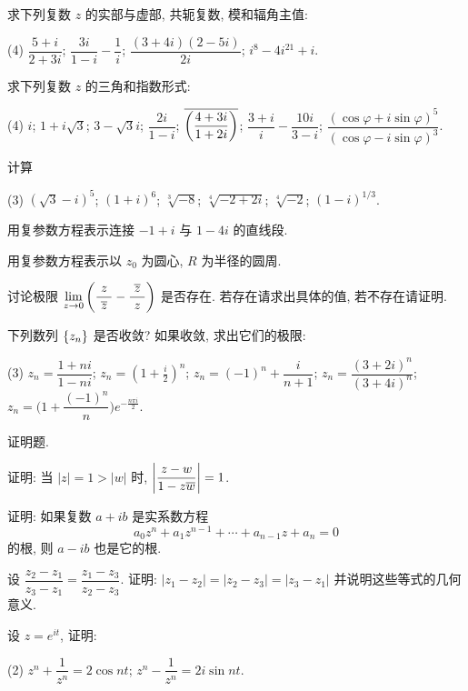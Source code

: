 \begin{homework}
\begin{exlist}
      \item 求下列复数 $z$ 的实部与虚部, 共轭复数, 模和辐角主值:
        \begin{tasks}(4)
          \task $\dfrac{5+i}{2+3i}$;
          \task $\dfrac{3i}{1-i}-\dfrac1i$;
          \task $\dfrac{(3+4i)(2-5i)}{2i}$;
          \task $i^8-4i^{21}+i$.
        \end{tasks}
      \item 求下列复数 $z$ 的三角和指数形式:
        \begin{tasks}(4)
          \task $i$;
          \task $1+i\sqrt3$;
          \task $3-\sqrt 3i$;
          \task $\dfrac{2i}{1-i}$;
          \task $\overline{\biggl(\dfrac{4+3i}{1+2i}\biggr)}$;
          \task $\dfrac{3+i}{i}-\dfrac{10i}{3-i}$;
          \task $\dfrac{(\cos \varphi+i\sin \varphi)^5}{(\cos \varphi-i\sin \varphi)^3}$.
        \end{tasks}
      \item 计算
        \begin{tasks}(3)
          \task $(\sqrt3-i)^5$;
          \task $(1+i)^6$;
          \task $\sqrt[3]{-8}$;
          \task $\sqrt[4]{-2+2i}$;
          \task $\sqrt[4]{-2}$;
          \task $(1-i)^{1/3}$.
        \end{tasks}
      \item 用复参数方程表示连接 $-1+i$ 与 $1-4i$ 的直线段.
      \item 用复参数方程表示以 $z_0$ 为圆心, $R$ 为半径的圆周.
      \item 讨论极限 $\displaystyle\lim_{z\to0}\left(\frac{z}{~\overline z~}-\frac{~\overline z~}z\right)$ 是否存在. 若存在请求出具体的值, 若不存在请证明.
      \item 下列数列 ${\left\{z_n\right\}}$ 是否收敛? 如果收敛, 求出它们的极限:
        \begin{tasks}(3)
          \task $z_n=\dfrac{1+ni}{1-ni}$;
          \task $\displaystyle z_n=\left(1+\frac i2\right)^n$;
          \task $z_n=(-1)^n+\dfrac{i}{n+1}$;
          \task $z_n=\dfrac{(3+2i)^n}{(3+4i)^n}$;
          \task $z_n=\biggl(1+\dfrac{(-1)^n}n\biggr)e^{-\frac{n\pi i}2}$.
        \end{tasks}
    \end{exlist}
  \item 证明题.
    \begin{exlist}
      \item 证明: 当 $|z|=1>|w|$ 时, $\left|\dfrac{z-w}{1-z\overline w}\right|=1$.
      \item 证明: 如果复数 $a+ib$ 是实系数方程
      	\[a_0z^n+a_1z^{n-1}+\cdots+a_{n-1}z+a_n=0\]
      	的根, 则 $a-ib$ 也是它的根.
      \item 设 $\dfrac{z_2-z_1}{z_3-z_1}=\dfrac{z_1-z_3}{z_2-z_3}$. 证明: $|z_1-z_2|=|z_2-z_3|=|z_3-z_1|$ 并说明这些等式的几何意义.
      \item 设 $z=e^{it}$, 证明:\begin{tasks}(2)
          \task $z^n+\dfrac1{z^n}=2\cos{nt}$;
          \task $z^n-\dfrac1{z^n}=2i\sin{nt}$.
        \end{tasks}
    \end{exlist}
\end{homework}



